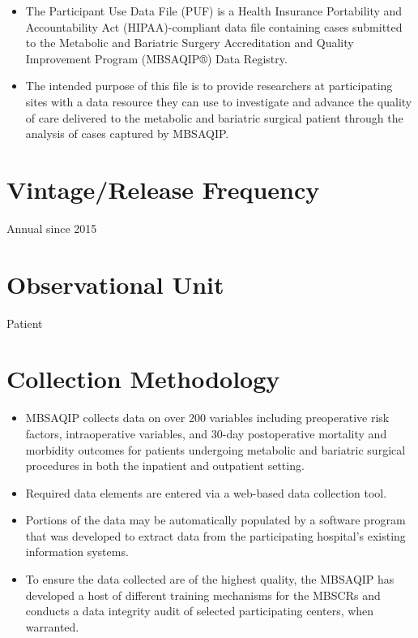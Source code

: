\documentclass[
]{book}
\providecommand{\tightlist}{%
  \setlength{\itemsep}{0pt}\setlength{\parskip}{0pt}}
\begin{document}
\begin{itemize}
\tightlist
\item
  The Participant Use Data File (PUF) is a Health Insurance Portability and Accountability Act (HIPAA)-compliant data file containing cases submitted to the Metabolic and Bariatric Surgery Accreditation and Quality Improvement Program (MBSAQIP®) Data Registry.
\item
  The intended purpose of this file is to provide researchers at participating sites with a data resource they can use to investigate and advance the quality of care delivered to the metabolic and bariatric surgical patient through the analysis of cases captured by MBSAQIP.
\end{itemize}

\hypertarget{vintagerelease-frequency-39}{%
\section{Vintage/Release Frequency}\label{vintagerelease-frequency-39}}

Annual since 2015

\hypertarget{observational-unit-39}{%
\section{Observational Unit}\label{observational-unit-39}}

Patient

\hypertarget{collection-methodology-39}{%
\section{Collection Methodology}\label{collection-methodology-39}}

\begin{itemize}
\tightlist
\item
  MBSAQIP collects data on over 200 variables including preoperative risk factors, intraoperative variables, and 30-day postoperative mortality and morbidity outcomes for patients undergoing metabolic and bariatric surgical procedures in both the inpatient and outpatient setting.
\item
  Required data elements are entered via a web-based data collection tool.
\item
  Portions of the data may be automatically populated by a software program that was developed to extract data from the participating hospital's existing information systems.
\item
  To ensure the data collected are of the highest quality, the MBSAQIP has developed a host of different training mechanisms for the MBSCRs and conducts a data integrity audit of selected participating centers, when warranted.
\end{itemize}
\end{document}
